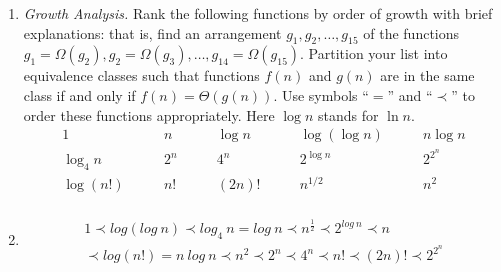 \documentclass[12pt,a4paper]{article}
\makeatletter
\newtheorem*{solution}{Solution}
\theoremstyle{definition}
\renewenvironment{solution}[1][Solution] {\par\pushQED{\qed}\normalfont\topsep6\p@\@plus6\p@\relax\trivlist\item[\hskip\labelsep\bfseries#1\@addpunct{.}]\ignorespaces}{\popQED\endtrivlist\@endpefalse} \makeatother
\makeatother
\begin{document}
\begin{enumerate}
\item \textit{Growth Analysis.} Rank the following functions by order of growth with brief explanations: that is, find an arrangement $g_1, g_2, \ldots , g_{15}$ of the functions $g_1 = \Omega(g_2), g_2 = \Omega(g_3), \ldots, g_{14} = \Omega(g_{15})$.  Partition your list into equivalence classes such that functions $f(n)$ and $g(n)$ are in the same class if and only if $f(n) = \Theta(g(n))$. Use symbols ``$=$'' and ``$\prec$'' to order these functions appropriately. Here $\log n$ stands for $\ln n$.
$$
\begin{array}{ccccc}
	1 \quad & \quad n \quad & \quad \log n \quad & \quad \log (\log n) \quad & \quad n \log n \\
	\log_4 n \quad & \quad 2^n \quad & \quad 4^n \quad & \quad 2^{\log n} \quad & \quad 2^{2^n} \\
	\log (n!) \quad & \quad n! \quad & \quad (2n)! \quad & \quad  n^{1/2} \quad & \quad n^2 \\
\end{array}
$$
    \begin{solution}
       \begin{equation}
       \begin{aligned}
           1 \prec log(log~n) \prec log_4~n =log~n \prec n^{\frac{1}{2}}  \prec 2^{log~n}\prec n\\\prec log(n!)= n~log~n \prec n^2 \prec 2^n \prec 4^n \prec n! \prec (2n)! \prec 2^{2^n}
       \end{aligned}
       \end{equation}
    \end{solution}


\end{enumerate}

\vspace{20pt}


\end{document}
